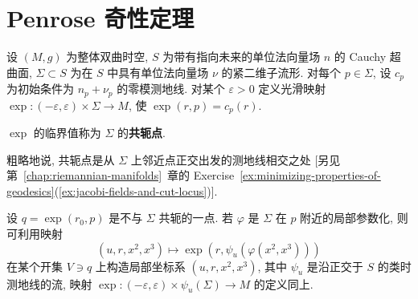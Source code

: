 \section{Penrose 奇性定理}\label{sec:penrose-singularity-theorem}

设 $(M,g)$ 为整体双曲时空, $S$ 为带有指向未来的单位法向量场 $n$ 的 Cauchy 超曲面, $\Sigma\subset S$ 为在 $S$ 中具有单位法向量场 $\nu$ 的紧二维子流形. 对每个 $p\in\Sigma$, 设 $c_p$ 为初始条件为 $n_p+\nu_p$ 的零模测地线. 对某个 $\varepsilon>0$ 定义光滑映射 $\exp:(-\varepsilon,\varepsilon)\times\Sigma\to M$, 使 $\exp(r,p)=c_p(r)$.

\begin{RiemannDefinition}\label{def:conjugate-points-to-spacelike-surface}
$\exp$ 的临界值称为 $\Sigma$ 的\textbf{共轭点}.
\end{RiemannDefinition}

粗略地说, 共轭点是从 $\Sigma$ 上邻近点正交出发的测地线相交之处 [另见第~\ref{chap:riemannian-manifolds}~章的 Exercise~\ref{ex:minimizing-properties-of-geodesics}(\ref{ex:jacobi-fields-and-cut-locus})].

设 $q=\exp(r_0,p)$ 是不与 $\Sigma$ 共轭的一点. 若 $\varphi$ 是 $\Sigma$ 在 $p$ 附近的局部参数化, 则可利用映射
\[
  (u,r,x^2,x^3)\longmapsto \exp(r,\psi_u(\varphi(x^2,x^3)))
\]
在某个开集 $V\ni q$ 上构造局部坐标系 $(u,r,x^2,x^3)$, 其中 $\psi_u$ 是沿正交于 $S$ 的类时测地线的流, 映射 $\exp:(-\varepsilon,\varepsilon)\times\psi_u(\Sigma)\to M$ 的定义同上.

